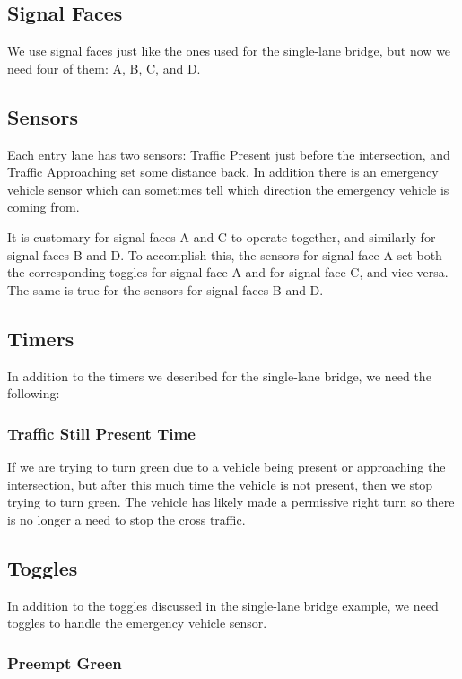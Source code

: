 \documentclass[letterpaper,twoside]{article}
\begin{document}
\subsection{Signal Faces}

We use signal faces just like the ones used for the single-lane
bridge, but now we need four of them: A, B, C, and D.

\subsection{Sensors}

Each entry lane has two sensors: Traffic Present just before the intersection,
and Traffic Approaching set some distance back.  In addition there is an
emergency vehicle sensor which can sometimes tell which direction
the emergency vehicle is coming from.

It is customary for signal faces A and C to operate together,
and similarly for signal faces B and D.  To accomplish this, the sensors for
signal face A set both the corresponding toggles for signal face A
and for signal face C, and vice-versa.  The same is true for the sensors
for signal faces B and D.

\subsection{Timers}

In addition to the timers we described for the single-lane bridge,
we need the following:

\subsubsection{Traffic Still Present Time}
If we are trying to turn green due to a vehicle being present or approaching
the intersection, but after this much time the vehicle is not present, then
we stop trying to turn green.  The vehicle has likely made a permissive right
turn so there is no longer a need to stop the cross traffic.

\subsection{Toggles}

In addition to the toggles discussed in the single-lane bridge example,
we need toggles to handle the emergency vehicle sensor.

\subsubsection{Preempt Green}
\end{document}
